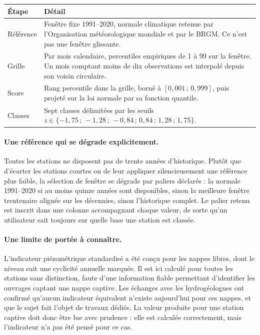 \begin{center}
\begin{tabularx}{\textwidth}{@{}lX@{}}
\toprule
\textbf{Étape} & \textbf{Détail} \\
\midrule
Référence & Fenêtre fixe 1991--2020, normale climatique retenue par l'Organisation
météorologique mondiale et par le BRGM. Ce n'est pas une fenêtre glissante. \\
Grille & Par mois calendaire, percentiles empiriques de 1 à 99 sur la fenêtre. Un mois comptant
moins de dix observations est interpolé depuis son voisin circulaire. \\
Score & Rang percentile dans la grille, borné à $[0{,}001\,;\,0{,}999]$, puis projeté sur la loi
normale par sa fonction quantile. \\
Classes & Sept classes délimitées par les seuils $z \in \{-1{,}75\,;\,-1{,}28\,;\,-0{,}84\,;\,
0{,}84\,;\,1{,}28\,;\,1{,}75\}$. \\
\bottomrule
\end{tabularx}
\end{center}

\paragraph{Une référence qui se dégrade explicitement.} Toutes les stations ne disposent pas de
trente années d'historique. Plutôt que d'écarter les stations courtes ou de leur appliquer
silencieusement une référence plus faible, la sélection de fenêtre se dégrade par paliers
déclarés : la normale 1991--2020 si au moins quinze années sont disponibles, sinon la meilleure
fenêtre trentenaire alignée sur les décennies, sinon l'historique complet. Le palier retenu est
inscrit dans une colonne accompagnant chaque valeur, de sorte qu'un utilisateur sait toujours
sur quelle base une station est classée.

\paragraph{Une limite de portée à connaître.} L'indicateur piézométrique standardisé a été
conçu pour les nappes libres, dont le niveau suit une cyclicité annuelle marquée. Il est ici
calculé pour toutes les stations sans distinction, faute d'une information fiable permettant
d'identifier les ouvrages captant une nappe captive. Les échanges avec les hydrogéologues ont
confirmé qu'aucun indicateur équivalent n'existe aujourd'hui pour ces nappes, et que le sujet
fait l'objet de travaux dédiés. La valeur produite pour une station captive doit donc être lue
avec prudence : elle est calculée correctement, mais l'indicateur n'a pas été pensé pour ce cas.

